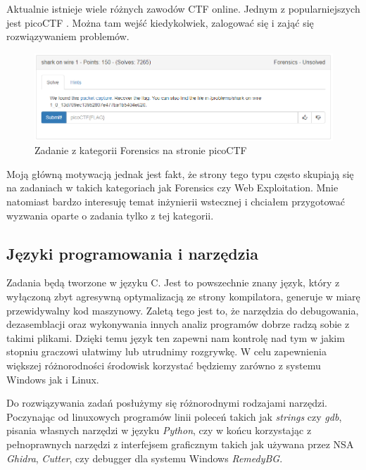 \documentclass[polish,12pt]{aghthesis}
\begin{document}
Aktualnie istnieje wiele różnych zawodów CTF online.
Jednym z popularniejszych jest \newline picoCTF \cite{picoCTF}.
Można tam wejść kiedykolwiek, zalogować się i zająć się rozwiązywaniem problemów.

\begin{figure}[ht]
    \centering
    \includegraphics[width=15cm]{picoctf}
    \caption{Zadanie z kategorii Forensics na stronie picoCTF}
    \label{fig:picoctf}
\end{figure}

Moją główną motywacją jednak jest fakt, że strony tego typu często skupiają
się na zadaniach w takich kategoriach jak Forensics czy Web Exploitation.
Mnie natomiast bardzo interesuję temat inżynierii wstecznej i chciałem
przygotować wyzwania oparte o zadania tylko z tej kategorii.

\subsection{Języki programowania i narzędzia}

Zadania będą tworzone w języku C. Jest to powszechnie znany język, który
z wyłączoną zbyt agresywną optymalizacją ze strony kompilatora, generuje
w miarę przewidywalny kod maszynowy. Zaletą tego jest to, że narzędzia
do debugowania, dezasemblacji oraz wykonywania innych analiz programów
dobrze radzą sobie z takimi plikami. Dzięki temu język ten
zapewni nam kontrolę nad tym w jakim stopniu graczowi ułatwimy
lub utrudnimy rozgrywkę. W celu zapewnienia większej różnorodności
środowisk korzystać będziemy zarówno z systemu Windows jak i Linux.

Do rozwiązywania zadań posłużymy się różnorodnymi rodzajami narzędzi.
Poczynając od linuxowych programów linii poleceń takich jak \emph{strings}
czy \emph{gdb}, pisania własnych narzędzi w języku \emph{Python},
czy w końcu korzystając z pełnoprawnych narzędzi z interfejsem graficznym takich
jak używana przez NSA \emph{Ghidra}, \emph{Cutter}, czy debugger dla systemu
Windows \emph{RemedyBG}.

\clearpage
\end{document}
